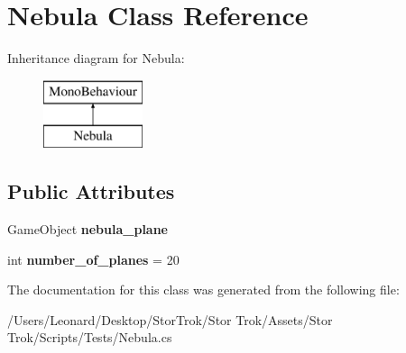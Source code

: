 \hypertarget{class_nebula}{}\section{Nebula Class Reference}
\label{class_nebula}
Inheritance diagram for Nebula\+:\begin{figure}[H]
\begin{center}
\leavevmode
\includegraphics[height=2.000000cm]{class_nebula}
\end{center}
\end{figure}
\subsection*{Public Attributes}
\begin{DoxyCompactItemize}
\item 
\mbox{\label{class_nebula_aa9311aa6a4beb53e52c649a286e8ad47}} 
Game\+Object {\bfseries nebula\+\_\+plane}
\item 
\mbox{\label{class_nebula_a20a8755c3875c3b075f0ed8d53ca341c}} 
int {\bfseries number\+\_\+of\+\_\+planes} = 20
\end{DoxyCompactItemize}


The documentation for this class was generated from the following file\+:\begin{DoxyCompactItemize}
\item 
/\+Users/\+Leonard/\+Desktop/\+Stor\+Trok/\+Stor Trok/\+Assets/\+Stor Trok/\+Scripts/\+Tests/Nebula.\+cs\end{DoxyCompactItemize}
